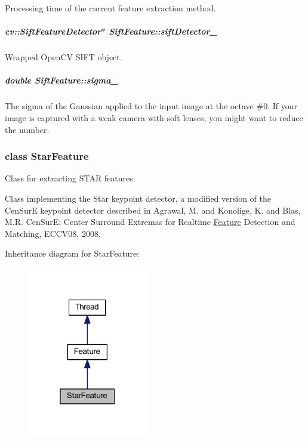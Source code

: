 Processing time of the current feature extraction method. 

\hypertarget{group___feature_extractor_a4e08df2e30da758a11d029eae0352cf5}{
\subparagraph[{sift\-Detector\-\_\-}]{\setlength{\rightskip}{0pt plus 5cm}cv\-::\-Sift\-Feature\-Detector$\ast$ Sift\-Feature\-::sift\-Detector\-\_\-\hspace{0.3cm}{\ttfamily [private]}}}\label{group___feature_extractor_a4e08df2e30da758a11d029eae0352cf5}


Wrapped Open\-C\-V S\-I\-F\-T object. 

\hypertarget{group___feature_extractor_a574fb46dbb906801014beb9a731b980a}{
\subparagraph[{sigma\-\_\-}]{\setlength{\rightskip}{0pt plus 5cm}double Sift\-Feature\-::sigma\-\_\-\hspace{0.3cm}{\ttfamily [private]}}}\label{group___feature_extractor_a574fb46dbb906801014beb9a731b980a}


The sigma of the Gaussian applied to the input image at the octave \#0. If your image is captured with a weak camera with soft lenses, you might want to reduce the number. 

\label{class_star_feature}
\hypertarget{group___feature_extractor_class_star_feature}{}
\subsubsection{class Star\-Feature}
Class for extracting S\-T\-A\-R features. 

Class implementing the Star keypoint detector, a modified version of the Cen\-Sur\-E keypoint detector described in Agrawal, M. and Konolige, K. and Blas, M.\-R. \-Cen\-Sur\-E\-: Center Surround Extremas for Realtime \hyperlink{group___feature_extractor_class_feature}{Feature} Detection and Matching, E\-C\-C\-V08, 2008. 

Inheritance diagram for Star\-Feature\-:
\nopagebreak
\begin{figure}[H]
\begin{center}
\leavevmode
\includegraphics[width=148pt]{class_star_feature__inherit__graph}
\end{center}
\end{figure}


